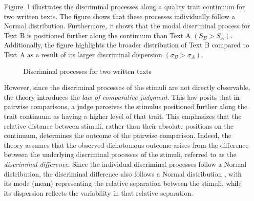 \documentclass[
  authoryear,
  preprint,
  1p]{elsarticle}
\begin{document}
Figure~\ref{fig-discriminal_process} illustrates the discriminal
processes along a quality trait continuum for two written texts. The
figure shows that these processes individually follow a Normal
distribution. Furthermore, it shows that the modal discriminal process
for Text B is positioned further along the continuum than Text A
\((S_{B} > S_{A})\). Additionally, the figure highlights the broader
distribution of Text B compared to Text A as a result of its larger
discriminal dispersion \((\sigma_{B} > \sigma_{A})\).

\begin{figure}


\caption{\label{fig-discriminal_process}Discriminal processes for two
written texts}

\end{figure}%

However, since the discriminal processes of the stimuli are not directly
observable, the theory introduces the \emph{law of comparative
judgment}. This law posits that in pairwise comparisons, a judge
perceives the stimulus positioned further along the trait continuum as
having a higher level of that trait. This emphasizes that the relative
distance between stimuli, rather than their absolute positions on the
continuum, determines the outcome of the pairwise comparison. Indeed,
the theory assumes that the observed dichotomous outcome arises from the
difference between the underlying discriminal processes of the stimuli,
referred to as the \emph{discriminal difference}. Since the individual
discriminal processes follow a Normal distribution, the discriminal
difference also follows a Normal distribution \citep{Andrich_1978}, with
its mode (mean) representing the relative separation between the
stimuli, while its dispersion reflects the variability in that relative
separation.
\end{document}
